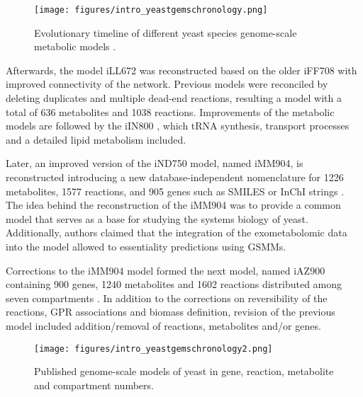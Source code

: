 \begin{figure}[H]
\begin{center}
\texttt{[image: figures/intro\_yeastgemschronology.png]}
\caption[Evolutionary timeline of different yeast species genome-scale metabolic models \cite{lopes2017genome}.]{Evolutionary timeline of different yeast species genome-scale metabolic models \cite{lopes2017genome}.}
\label{fig:intro_yeastgemschronology}
\end{center}
\end{figure}

\vspace{-1cm}

Afterwards, the model iLL672 was reconstructed based on the older iFF708 with improved connectivity of the network\cite{kuepfer2005metabolic}. Previous models were reconciled by deleting duplicates and multiple dead-end reactions, resulting a model with a total of 636 metabolites and 1038 reactions. Improvements of the metabolic models are followed by the iIN800 \cite{nookaew2008genome}, which tRNA synthesis, transport processes and a detailed lipid metabolism included.

Later, an improved version of the iND750 model, named iMM904, is reconstructed introducing a new database-independent nomenclature for 1226 metabolites, 1577 reactions, and 905 genes such as SMILES or InChI strings \cite{mo2009connecting}. The idea behind the reconstruction of the iMM904 was to provide a common model that serves as a base for studying the systems biology of yeast. Additionally, authors claimed that the  integration of the exometabolomic data into the model allowed to essentiality predictions using GSMMs.

Corrections to the iMM904 model formed the next model, named iAZ900 containing 900 genes, 1240 metabolites and 1602 reactions distributed among seven compartments \cite{zomorrodi2010improving}. In addition to the corrections on reversibility of the reactions, GPR associations and biomass definition, revision of the previous model included addition/removal of reactions, metabolites and/or genes.

\begin{figure}[H]
\texttt{[image: figures/intro\_yeastgemschronology2.png]}
\caption[Published genome-scale models of yeast in gene, reaction, metabolite and compartment numbers\cite{lopes2017genome}.]{Published genome-scale models of yeast in gene, reaction, metabolite and compartment numbers\cite{lopes2017genome}.}
\label{fig:intro_yeastgemschronology2}
\end{figure}

